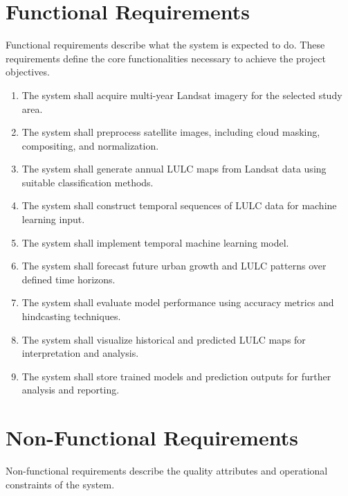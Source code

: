 \documentclass[main]{subfiles}
\begin{document}
\section{Functional Requirements}
Functional requirements describe what the system is expected to do. These requirements define the core functionalities necessary to achieve the project objectives.

\begin{enumerate}[label=\roman*.]
    \item The system shall acquire multi-year Landsat imagery for the selected study area.
    \item The system shall preprocess satellite images, including cloud masking, compositing, and normalization.
    \item The system shall generate annual LULC maps from Landsat data using suitable classification methods.
    \item The system shall construct temporal sequences of LULC data for machine learning input.
    \item The system shall implement temporal machine learning model.
    \item The system shall forecast future urban growth and LULC patterns over defined time horizons.
    \item The system shall evaluate model performance using accuracy metrics and hindcasting techniques.
    \item The system shall visualize historical and predicted LULC maps for interpretation and analysis.
    \item The system shall store trained models and prediction outputs for further analysis and reporting.
\end{enumerate}

\section{Non-Functional Requirements}
Non-functional requirements describe the quality attributes and operational constraints of the system.
\end{document}
